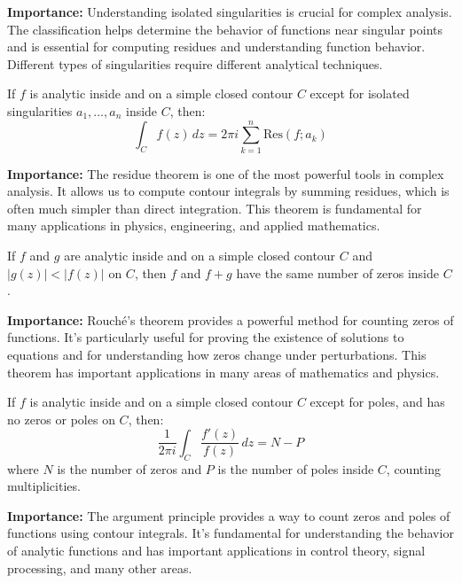 \noindent\textbf{Importance:} Understanding isolated singularities is crucial for complex analysis. The classification helps determine the behavior of functions near singular points and is essential for computing residues and understanding function behavior. Different types of singularities require different analytical techniques.



\begin{theorem}
If $f$ is analytic inside and on a simple closed contour $C$ except for isolated singularities $a_1, \ldots, a_n$ inside $C$, then:
\[\int_C f(z) \, dz = 2\pi i \sum_{k=1}^n \text{Res}(f; a_k)\]
\end{theorem}

\noindent\textbf{Importance:} The residue theorem is one of the most powerful tools in complex analysis. It allows us to compute contour integrals by summing residues, which is often much simpler than direct integration. This theorem is fundamental for many applications in physics, engineering, and applied mathematics.



\begin{theorem}
If $f$ and $g$ are analytic inside and on a simple closed contour $C$ and $|g(z)| < |f(z)|$ on $C$, then $f$ and $f + g$ have the same number of zeros inside $C$.
\end{theorem}

\noindent\textbf{Importance:} Rouché's theorem provides a powerful method for counting zeros of functions. It's particularly useful for proving the existence of solutions to equations and for understanding how zeros change under perturbations. This theorem has important applications in many areas of mathematics and physics.



\begin{theorem}
If $f$ is analytic inside and on a simple closed contour $C$ except for poles, and has no zeros or poles on $C$, then:
\[\frac{1}{2\pi i} \int_C \frac{f'(z)}{f(z)} \, dz = N - P\]
where $N$ is the number of zeros and $P$ is the number of poles inside $C$, counting multiplicities.
\end{theorem}

\noindent\textbf{Importance:} The argument principle provides a way to count zeros and poles of functions using contour integrals. It's fundamental for understanding the behavior of analytic functions and has important applications in control theory, signal processing, and many other areas.





